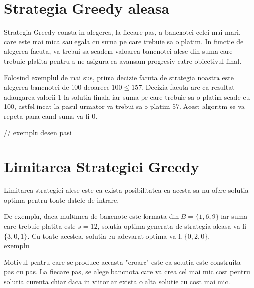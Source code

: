 \section{Strategia Greedy aleasa}

Strategia Greedy consta in alegerea, la fiecare pas, a bancnotei celei mai mari, care este mai mica sau egala cu suma pe care trebuie sa o platim. In functie de alegerea facuta, va trebui sa scadem valoarea bancnotei alese din suma care trebuie platita pentru a ne asigura ca avansam progresiv catre obiectivul final.
\par
Folosind exemplul de mai sus, prima decizie facuta de strategia noastra este alegerea bancnotei de 100 deoarece $ 100 	\leq 157$.  Decizia facuta are ca rezultat adaugarea valorii 1 la solutia finala iar suma pe care trebuie sa o platim scade cu 100, astfel incat la pasul urmator va trebui sa o platim 57. Acest algoritm se va repeta pana cand suma va fi 0.



// exemplu desen pasi 

\section{Limitarea Strategiei Greedy}
Limitarea strategiei alese este ca exista posibilitatea ca acesta sa nu ofere solutia optima pentru toate datele de intrare.\par
De exemplu, daca multimea de bancnote este formata din $B = \{ 1,6,9 \}$ iar suma care trebuie platita este $s = 12$, solutia optima generata de strategia aleasa va fi $\{3,0,1\}$. Cu toate acestea, solutia cu adevarat optima va fi $\{0,2,0\}$. 
\\exemplu

Motivul pentru care se produce aceasta "eroare" este ca solutia este construita pas cu pas. La fiecare pas, se alege bancnota care va crea cel mai mic cost pentru solutia curenta chiar daca in viitor ar exista o alta solutie cu cost mai mic.












